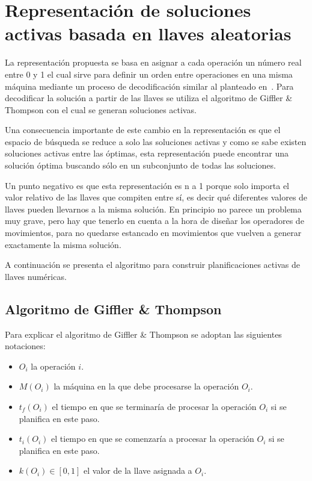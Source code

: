 \section{Representación de soluciones activas basada en llaves aleatorias}
La representación propuesta se basa en asignar a cada operación un número real entre 0 y 1 el cual sirve para definir un orden entre 
operaciones en una misma máquina mediante un proceso de decodificación similar al planteado en~\cite{bean1994genetic,norman1996random,Ponsich2013}.
%
Para decodificar la solución a partir de las llaves se utiliza el algoritmo de Giffler \& Thompson \cite{Giffler1960} con el cual se generan 
soluciones activas.

Una consecuencia importante de este cambio en la representación es que el espacio de búsqueda se reduce a solo las soluciones activas y como se sabe 
existen soluciones activas entre las óptimas, esta representación puede encontrar una solución óptima buscando sólo en un subconjunto de todas las
soluciones.

Un punto negativo es que esta representación es n a 1 porque solo importa el valor relativo de las llaves que compiten entre sí, es decir qué diferentes 
valores de llaves pueden llevarnos a la misma solución. 
%
En principio no parece un problema muy grave, pero hay que tenerlo en cuenta a la hora de diseñar los operadores de movimientos, para no quedarse
estancado en movimientos que vuelven a generar exactamente la misma solución.

A continuación se presenta el algoritmo para construir planificaciones activas de llaves numéricas.

\subsection{Algoritmo de Giffler \& Thompson}
Para explicar el algoritmo de Giffler \& Thompson se adoptan las siguientes notaciones:
\begin{itemize}
    \item $O_i$ la operación $i$.
    \item $M(O_i)$ la máquina en la que debe procesarse la operación $O_i$.
    \item $t_f(O_i)$ el tiempo en que se terminaría de procesar la operación $O_i$ si se planifica en este paso.
    \item $t_i(O_i)$ el tiempo en que se comenzaría a procesar la operación $O_i$ si se planifica en este paso.
    \item $k(O_i)\in [0,1]$ el valor de la llave asignada a $O_i$.
\end{itemize}

